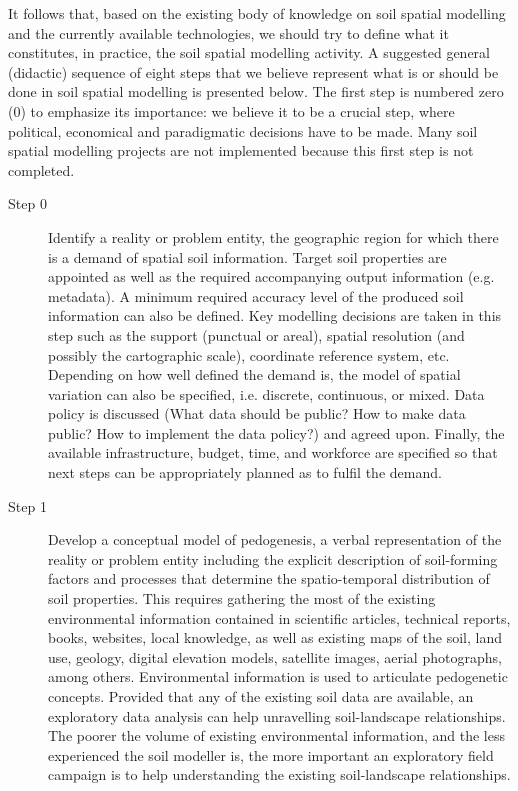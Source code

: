 It follows that, based on the existing body of knowledge on soil spatial modelling and the currently available 
technologies, we should try to define what it constitutes, in practice, the soil spatial modelling activity. A 
suggested general (didactic) sequence of eight steps that we believe represent what is or should be done in 
soil spatial modelling is presented below. The first step is numbered zero (0) to emphasize its importance: we
believe it to be a crucial step, where political, economical and paradigmatic decisions have to be made. Many
soil spatial modelling projects are not implemented because this first step is not completed.

\begin{description}
\item[Step 0] Identify a reality or problem entity, the geographic region for which there is a demand of 
spatial soil information. Target soil properties are appointed as well as the required accompanying output 
information (e.g. metadata). A minimum required accuracy level of the produced soil information can also be 
defined. Key modelling decisions are taken in this step such as the support (punctual or areal), spatial 
resolution (and possibly the cartographic scale), coordinate reference system, etc. Depending on how well 
defined the demand is, the model of spatial variation can also be specified, i.e. discrete, continuous, or 
mixed. Data policy is discussed (What data should be public? How to make data public? How to implement the 
data policy?) and agreed upon. Finally, the available infrastructure, budget, time, and workforce are 
specified so that next steps can be appropriately planned as to fulfil the demand.

\item[Step 1] Develop a conceptual model of pedogenesis, a verbal representation of the reality or problem 
entity including the explicit description of soil-forming factors and processes that determine the 
spatio-temporal distribution of soil properties. This requires gathering the most of the existing 
environmental information contained in scientific articles, technical reports, books, websites, local 
knowledge, as well as existing maps of the soil, land use, geology, digital elevation models, satellite 
images, aerial photographs, among others. Environmental information is used to articulate pedogenetic 
concepts. Provided that any of the existing soil data are available, an exploratory data analysis can help 
unravelling soil-landscape relationships. The poorer the volume of existing environmental information, and the 
less experienced the soil modeller is, the more important an exploratory field campaign is to help 
understanding the existing soil-landscape relationships.


\end{description}
